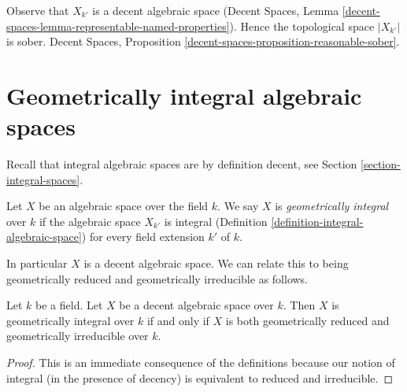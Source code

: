 \noindent
Observe that $X_{k'}$ is a decent algebraic space
(Decent Spaces, Lemma
\ref{decent-spaces-lemma-representable-named-properties}).
Hence the topological space $|X_{k'}|$ is sober.
Decent Spaces, Proposition \ref{decent-spaces-proposition-reasonable-sober}.





\section{Geometrically integral algebraic spaces}
\label{section-geometrically-integral}

\noindent
Recall that integral algebraic spaces are by definition decent, see
Section \ref{section-integral-spaces}.

\begin{definition}
\label{definition-geometrically-integral}
Let $X$ be an algebraic space over the field $k$. We say $X$ is
{\it geometrically integral} over $k$ if the algebraic space
$X_{k'}$ is integral (Definition \ref{definition-integral-algebraic-space})
for every field extension $k'$ of $k$.
\end{definition}

\noindent
In particular $X$ is a decent algebraic space.
We can relate this to being geometrically reduced and
geometrically irreducible as follows.

\begin{lemma}
\label{lemma-geometrically-integral}
Let $k$ be a field. Let $X$ be a decent algebraic space over $k$.
Then $X$ is geometrically integral over $k$ if and only if
$X$ is both geometrically reduced and geometrically irreducible
over $k$.
\end{lemma}

\begin{proof}
This is an immediate consequence of the definitions because our
notion of integral (in the presence of decency) is equivalent to
reduced and irreducible.
\end{proof}

